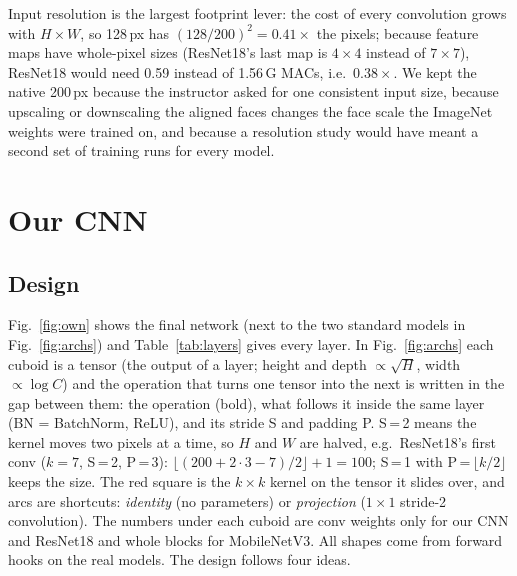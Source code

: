 \documentclass[conference,a4paper]{IEEEtran}
\begin{document}
Input resolution is the largest footprint lever: the cost of every convolution grows with $H\times W$, so 128\,px has $(128/200)^2 = 0.41\times$ the pixels; because feature maps have whole-pixel sizes (ResNet18's last map is $4\times4$ instead of $7\times7$), ResNet18 would need 0.59 instead of 1.56\,G MACs, i.e.\ $0.38\times$. We kept the native 200\,px because the instructor asked for one consistent input size, because upscaling or downscaling the aligned faces changes the face scale the ImageNet weights were trained on, and because a resolution study would have meant a second set of training runs for every model.

\section{Our CNN}
\label{sec:own}
\subsection{Design}
Fig.~\ref{fig:own} shows the final network (next to the two standard models in Fig.~\ref{fig:archs}) and Table~\ref{tab:layers} gives every layer. In Fig.~\ref{fig:archs} each cuboid is a tensor (the output of a layer; height and depth $\propto\sqrt{H}$, width $\propto\log C$) and the operation that turns one tensor into the next is written in the gap between them: the operation (bold), what follows it inside the same layer (BN = BatchNorm, ReLU), and its stride S and padding P. S\,=\,2 means the kernel moves two pixels at a time, so $H$ and $W$ are halved, e.g.\ ResNet18's first conv ($k=7$, S\,=\,2, P\,=\,3): $\lfloor(200+2\cdot3-7)/2\rfloor+1=100$; S\,=\,1 with P\,=\,$\lfloor k/2\rfloor$ keeps the size. The red square is the $k\times k$ kernel on the tensor it slides over, and arcs are shortcuts: \emph{identity} (no parameters) or \emph{projection} ($1\times1$ stride-2 convolution). The numbers under each cuboid are conv weights only for our CNN and ResNet18 and whole blocks for MobileNetV3. All shapes come from forward hooks on the real models. The design follows four ideas.
\end{document}
